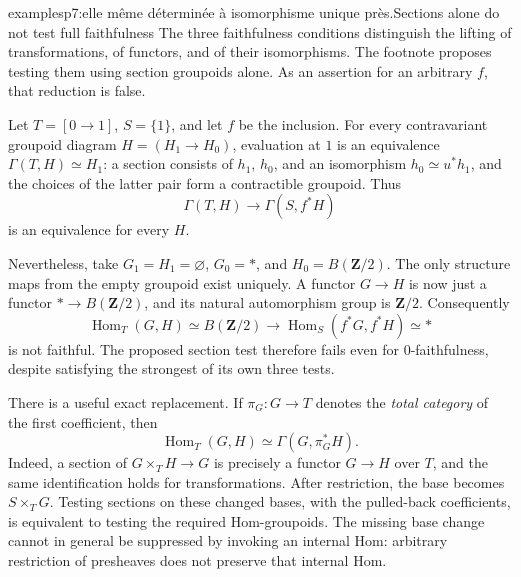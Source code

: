 \begin{dcomment}{examples}{p7:elle même déterminée à isomorphisme unique près.}{Sections alone do not test full faithfulness}
The three faithfulness conditions distinguish the lifting of transformations, of functors, and of their isomorphisms. The footnote proposes testing them using section groupoids alone. As an assertion for an arbitrary $f$, that reduction is false.

Let $T=[0\to1]$, $S=\{1\}$, and let $f$ be the inclusion. For every contravariant groupoid diagram $H=(H_1\to H_0)$, evaluation at $1$ is an equivalence $\Gamma(T,H)\simeq H_1$: a section consists of $h_1$, $h_0$, and an isomorphism $h_0\simeq u^*h_1$, and the choices of the latter pair form a contractible groupoid. Thus
\[
 \Gamma(T,H)\longrightarrow\Gamma(S,f^*H)
\]
is an equivalence for every $H$.

Nevertheless, take $G_1=H_1=\varnothing$, $G_0=*$, and $H_0=B(\mathbf Z/2)$. The only structure maps from the empty groupoid exist uniquely. A functor $G\to H$ is now just a functor $*\to B(\mathbf Z/2)$, and its natural automorphism group is $\mathbf Z/2$. Consequently
\[
 \operatorname{Hom}_T(G,H)\simeq B(\mathbf Z/2)
 \longrightarrow
 \operatorname{Hom}_S(f^*G,f^*H)\simeq *
\]
is not faithful. The proposed section test therefore fails even for $0$-faithfulness, despite satisfying the strongest of its own three tests.

There is a useful exact replacement. If $\pi_G:G\to T$ denotes the \emph{total category} of the first coefficient, then
\[
 \operatorname{Hom}_T(G,H)
 \simeq\Gamma(G,\pi_G^*H).
\]
Indeed, a section of $G\times_T H\to G$ is precisely a functor $G\to H$ over $T$, and the same identification holds for transformations. After restriction, the base becomes $S\times_T G$. Testing sections on these changed bases, with the pulled-back coefficients, is equivalent to testing the required Hom-groupoids. The missing base change cannot in general be suppressed by invoking an internal Hom: arbitrary restriction of presheaves does not preserve that internal Hom.
\end{dcomment}

